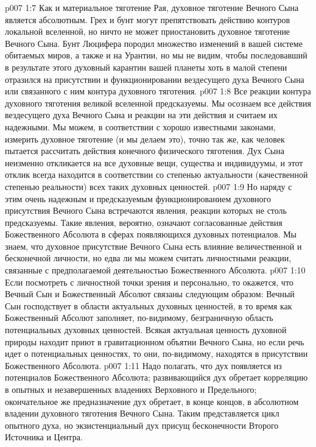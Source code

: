 \vs p007 1:7 \pc Как и материальное тяготение Рая, духовное тяготение Вечного Сына является абсолютным. Грех и бунт могут препятствовать действию контуров локальной вселенной, но ничто не может приостановить духовное тяготение Вечного Сына. Бунт Люцифера породил множество изменений в вашей системе обитаемых миров, а также и на Урантии, но мы не видим, чтобы последовавший в результате этого духовный карантин вашей планеты хоть в малой степени отразился на присутствии и функционировании вездесущего духа Вечного Сына или связанного с ним контура духовного тяготения.
\vs p007 1:8 \pc Все реакции контура духовного тяготения великой вселенной предсказуемы. Мы осознаем все действия вездесущего духа Вечного Сына и реакции на эти действия и считаем их надежными. Мы можем, в соответствии с хорошо известными законами, измерить духовное тяготение (и мы делаем это), точно так же, как человек пытается рассчитать действия конечного физического тяготения. Дух Сына неизменно откликается на все духовные вещи, существа и индивидуумы, и этот отклик всегда находится в соответствии со степенью актуальности (качественной степенью реальности) всех таких духовных ценностей.
\vs p007 1:9 Но наряду с этим очень надежным и предсказуемым функционированием духовного присутствия Вечного Сына встречаются явления, реакции которых не столь предсказуемы. Такие явления, вероятно, означают согласованные действия Божественного Абсолюта в сферах появляющихся духовных потенциалов. Мы знаем, что духовное присутствие Вечного Сына есть влияние величественной и бесконечной личности, но едва ли мы можем считать личностными реакции, связанные с предполагаемой деятельностью Божественного Абсолюта.
\vs p007 1:10 \pc Если посмотреть с личностной точки зрения и персонально, то окажется, что Вечный Сын и Божественный Абсолют связаны следующим образом: Вечный Сын господствует в области актуальных духовных ценностей, в то время как Божественный Абсолют заполняет, по\hyp{}видимому, безграничную область потенциальных духовных ценностей. Всякая актуальная ценность духовной природы находит приют в гравитационном объятии Вечного Сына, но если речь идет о потенциальных ценностях, то они, по\hyp{}видимому, находятся в присутствии Божественного Абсолюта.
\vs p007 1:11 Надо полагать, что дух появляется из потенциалов Божественного Абсолюта; развивающийся дух обретает корреляцию в опытных и незавершенных владениях Верховного и Предельного; окончательное же предназначение дух обретает, в конце концов, в абсолютном владении духовного тяготения Вечного Сына. Таким представляется цикл опытного духа, но экзистенциальный дух присущ бесконечности Второго Источника и Центра.
